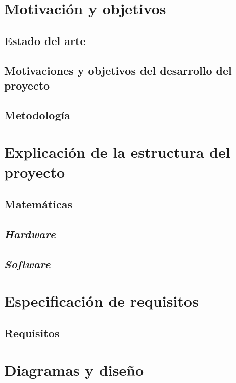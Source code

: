 \chapter{Motivación y objetivos}
\section{Estado del arte}

\section{Motivaciones y objetivos del desarrollo del proyecto}

\section{Metodología}
\label{sec:methodology}


\chapter{Explicación de la estructura del proyecto} 

\section{Matemáticas}

\section{\textit{Hardware}}

\section{\textit{Software}}


\chapter{Especificación de requisitos}
\section{Requisitos}

\chapter{Diagramas y diseño}



